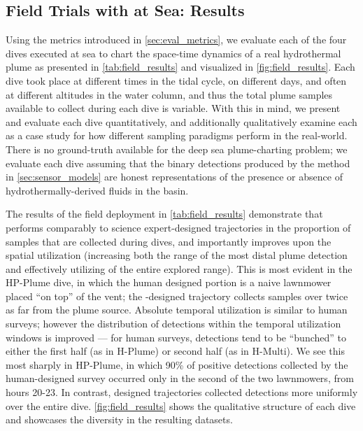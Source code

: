 \subsection{Field Trials with \PHORTEX at Sea: Results}
Using the metrics introduced in \cref{sec:eval_metrics}, we evaluate each of the four dives executed at sea to chart the space-time dynamics of a real hydrothermal plume as presented in \cref{tab:field_results} and visualized in \cref{fig:field_results}. Each dive took place at different times in the tidal cycle, on different days, and often at different altitudes in the water column, and thus the total plume samples available to collect during each dive is variable. With this in mind, we present and evaluate each dive quantitatively, and additionally qualitatively examine each as a case study for how different sampling paradigms perform in the real-world. There is no ground-truth available for the deep sea plume-charting problem; we evaluate each \Sentry dive assuming that the binary detections produced by the method in \cref{sec:sensor_models} are honest representations of the presence or absence of hydrothermally-derived fluids in the basin. 

The results of the field deployment in \cref{tab:field_results} demonstrate that \PHORTEX performs comparably to science expert-designed trajectories in the proportion of samples that are collected during dives, and importantly improves upon the spatial utilization (increasing both the range of the most distal plume detection and effectively utilizing of the entire explored range). This is most evident in the HP-Plume dive, in which the human designed portion is a naive lawnmower placed ``on top'' of the vent; the \PHORTEX-designed trajectory collects samples over twice as far from the plume source. Absolute temporal utilization is similar to human surveys; however the distribution of detections within the temporal utilization windows is improved --- for human surveys, detections tend to be ``bunched'' to either the first half (as in H-Plume) or second half (as in H-Multi). We see this most sharply in HP-Plume, in which 90\% of positive detections collected by the human-designed survey occurred only in the second of the two lawnmowers, from hours 20-23. In contrast, \PHORTEX designed trajectories collected detections more uniformly over the entire dive.  \cref{fig:field_results} shows the qualitative structure of each dive and showcases the diversity in the resulting datasets.

